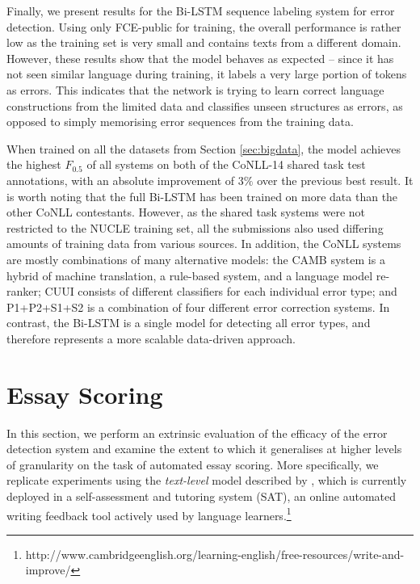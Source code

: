 \documentclass[11pt]{article}
\begin{document}
Finally, we present results for the Bi-LSTM sequence labeling system for error detection.
Using only FCE-public for training, the overall performance is rather low as the training set is very small and contains texts from a different domain. 
However, these results show that the model behaves as expected -- since it has not seen similar language during training, it labels a very large portion of tokens as errors.
This indicates that the network is trying to learn correct language constructions from the limited data and classifies unseen structures as errors, as opposed to simply memorising error sequences from the training data.


When trained on all the datasets from Section \ref{sec:bigdata}, the model achieves the highest $F_{0.5}$ of all systems on both of the CoNLL-14 shared task test annotations, with an absolute improvement of $3\%$ over the previous best result. 
It is worth noting that the full Bi-LSTM has been trained on more data than the other CoNLL contestants. However, as the shared task systems were not restricted to the NUCLE training set, all the submissions also used differing amounts of training data from various sources.
In addition, the CoNLL systems are mostly combinations of many alternative models: the CAMB system is a hybrid of machine translation, a rule-based system, and a language model re-ranker; CUUI consists of different classifiers for each individual error type; and P1+P2+S1+S2 is a combination of four different error correction systems.
In contrast, the Bi-LSTM is a single model for detecting all error types, and therefore represents a more scalable data-driven approach.



\section{Essay Scoring}

In this section, we perform an extrinsic evaluation of the efficacy of the error detection system and examine the extent to which it generalises at higher levels of granularity on the task of automated essay scoring. More specifically, we replicate experiments using the \textit{text-level} model described by , which is currently deployed in a self-assessment and tutoring system (SAT), an online automated writing feedback tool actively used by language learners.\footnote{http://www.cambridgeenglish.org/learning-english/free-resources/write-and-improve/}
\end{document}
